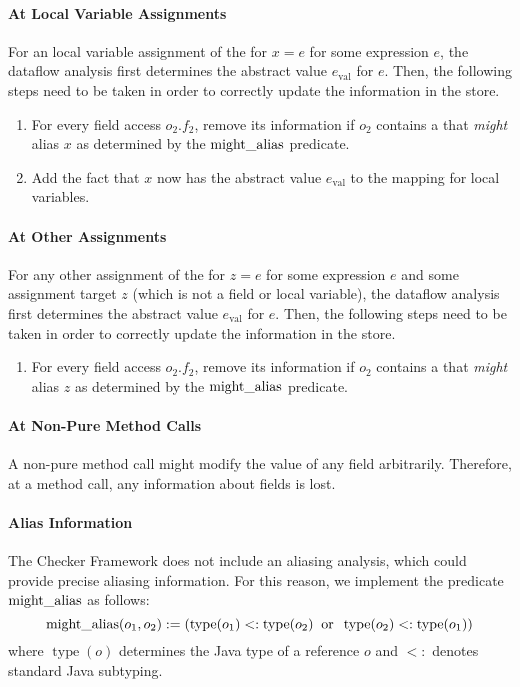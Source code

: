 \begin{new}
\paragraph{At Local Variable Assignments}

For an local variable assignment of the for $x = e$ for some expression $e$,
the dataflow analysis first determines the abstract value $e_\text{val}$ for
$e$. Then, the following steps need to be taken in order to correctly update
the information in the store.
\begin{enumerate}
    \item For every field access $o_2.f_2$, remove its information if
    $o_2$ contains a  that \emph{might}
    alias $x$ as determined by the $\operatorname{might\_alias}$
    predicate.
    \item Add the fact that $x$ now has the abstract value $e_\text{val}$
    to the mapping for local variables.
\end{enumerate}

\paragraph{At Other Assignments}

For any other assignment of the for $z = e$ for some expression $e$ and some
assignment target $z$ (which is not a field or local variable),
the dataflow analysis first determines the abstract value $e_\text{val}$ for
$e$. Then, the following steps need to be taken in order to correctly update
the information in the store.
\begin{enumerate}
    \item For every field access $o_2.f_2$, remove its information if
    $o_2$ contains a  that \emph{might}
    alias $z$ as determined by the $\operatorname{might\_alias}$ predicate.
\end{enumerate}


\paragraph{At Non-Pure Method Calls}

A non-pure method call might modify the value of any field arbitrarily.
Therefore, at a method call, any information about fields is lost.


\paragraph{Alias Information}
The Checker Framework does not include an aliasing analysis, which could
provide precise aliasing information.  For this reason, we implement the
predicate $\operatorname{might\_alias}$ as follows:
\[ \operatorname{might\_alias}(o_1,o_2) :=
\left(\operatorname{type}(o_1) <: \operatorname{type}(o_2)
\;\;\text{or}\;\;
\operatorname{type}(o_2) <: \operatorname{type}(o_1) \right) \]
where $\operatorname{type}(o)$ determines the Java type of a reference $o$
and $<:$ denotes standard Java subtyping.

\end{new}











